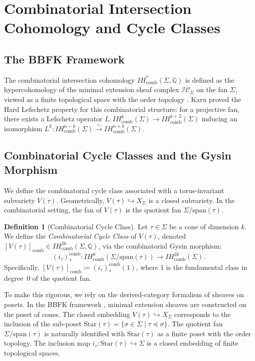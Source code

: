 \documentclass[12pt,reqno]{amsart}
\theoremstyle{plain}
\theoremstyle{definition}
\newtheorem{definition}{Definition}[section]
\newcommand{\IQ}{\mathbb{Q}}
\newcommand{\SigmaFan}{\Sigma}
\newcommand{\Star}{\mathrm{Star}}
\newcommand{\IHcomb}{IH_{\mathrm{comb}}}
\begin{document}
	\section{Combinatorial Intersection Cohomology and Cycle Classes}
	
	\subsection{The BBFK Framework}
	
	The combinatorial intersection cohomology $\IHcomb^*(\SigmaFan, \IQ)$ is defined as the hypercohomology of the minimal extension sheaf complex $\mathcal{IC}_{\SigmaFan}$ on the fan $\SigmaFan$, viewed as a finite topological space with the order topology \cite{BBFK}. Karu \cite{Karu} proved the Hard Lefschetz property for this combinatorial structure: for a projective fan, there exists a Lefschetz operator $L: \IHcomb^k(\SigmaFan) \to \IHcomb^{k+2}(\SigmaFan)$ inducing an isomorphism $L^k: \IHcomb^{n-k}(\SigmaFan) \xrightarrow{\sim} \IHcomb^{n+k}(\SigmaFan)$.
	
	\subsection{Combinatorial Cycle Classes and the Gysin Morphism}
	
	We define the combinatorial cycle class associated with a torus-invariant subvariety $V(\tau)$. Geometrically, $V(\tau) \hookrightarrow X_\SigmaFan$ is a closed subvariety. In the combinatorial setting, the fan of $V(\tau)$ is the quotient fan $\SigmaFan / \mathrm{span}(\tau)$.
	
	\begin{definition}[Combinatorial Cycle Class]
		\label{def:cycle_class}
		Let $\tau \in \SigmaFan$ be a cone of dimension $k$. We define the \emph{Combinatorial Cycle Class} of $V(\tau)$, denoted $[V(\tau)]_{\mathrm{comb}} \in \IHcomb^{2k}(\SigmaFan, \IQ)$, via the combinatorial Gysin morphism:
		\[
		(i_\tau)_*^{\mathrm{comb}}: \IHcomb^0(\SigmaFan / \mathrm{span}(\tau)) \to \IHcomb^{2k}(\SigmaFan).
		\]
		Specifically, $[V(\tau)]_{\mathrm{comb}} \coloneqq (i_\tau)_*^{\mathrm{comb}}(1)$, where $1$ is the fundamental class in degree~$0$ of the quotient fan.
	\end{definition}
	
	To make this rigorous, we rely on the derived-category formalism of sheaves on posets. In the BBFK framework \cite{BBFK}, minimal extension sheaves are constructed on the poset of cones. The closed embedding $V(\tau) \hookrightarrow X_\SigmaFan$ corresponds to the inclusion of the sub-poset $\Star(\tau) = \{ \sigma \in \SigmaFan \mid \tau \preceq \sigma \}$. The quotient fan $\SigmaFan / \mathrm{span}(\tau)$ is naturally identified with $\Star(\tau)$ as a finite poset with the order topology. The inclusion map $i_\tau: \Star(\tau) \hookrightarrow \SigmaFan$ is a closed embedding of finite topological spaces.
	
\end{document}
